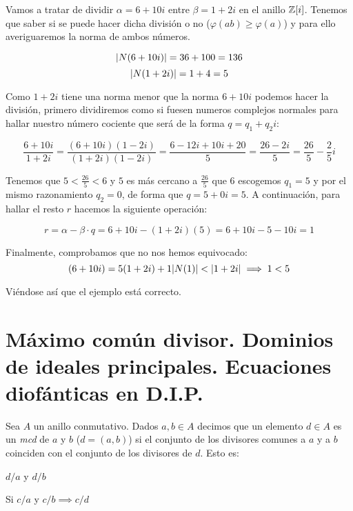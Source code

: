 \begin{ejemplo}
Vamos a tratar de dividir $\alpha=6+10i$ entre $\beta=1+2i$ en el anillo $\mathbb{Z}[i]$. Tenemos que saber si se puede hacer dicha división o no ($\varphi(ab) \ge \varphi(a)$) y para ello averiguaremos la norma de ambos números.

$$\lvert N(6+10i)\rvert=36+100=136$$
$$\lvert N(1+2i)\rvert=1+4=5$$

Como $1+2i$ tiene una norma menor que la norma $6+10i$ podemos hacer la división, primero dividiremos como si fuesen numeros complejos normales para hallar nuestro número cociente que será de la forma $q=q_1+q_2i$:

\[
	\frac{6+10i}{1+2i}=\frac{(6+10i)(1-2i)}{(1+2i)(1-2i)}=\frac{6-12i+10i+20}{5}=\frac{26-2i}{5}=\frac{26}{5}-\frac{2}{5}i
\]

Tenemos que $5<\frac{26}{5}<6$ y $5$ es más cercano a $\frac{26}{5}$ que $6$ escogemos $q_1=5$ y por el mismo razonamiento $q_2=0$, de forma que $q=5+0i=5$. A continuación, para hallar el resto $r$ hacemos la siguiente operación:

\[
	r=\alpha-\beta \cdot q = 6+10i - (1+2i)(5)=6+10i-5-10i=1
\]

Finalmente, comprobamos que no nos hemos equivocado:
\[
	(6+10i)=5(1+2i)+1\\
	\lvert N(1)\rvert<\lvert1+2i\rvert \implies 1<5
\]

Viéndose así que el ejemplo está correcto.

\end{ejemplo}

\section{Máximo común divisor. Dominios de ideales principales. Ecuaciones diofánticas en D.I.P.}


\begin{ndef}

Sea $A$ un anillo conmutativo. Dados $a,b \in A$ decimos que un elemento $d\in A$ es un \textit{mcd} de $a$ y $b$ ($d=(a,b)$) si el conjunto de los divisores comunes a $a$ y a $b$ coinciden con el conjunto de los divisores de $d$. Esto es:

\begin{nlist}
	\item $d/a$ y $d/b$
	\item Si $c/a$ y $c/b \implies c/d$
\end{nlist}

\end{ndef}

